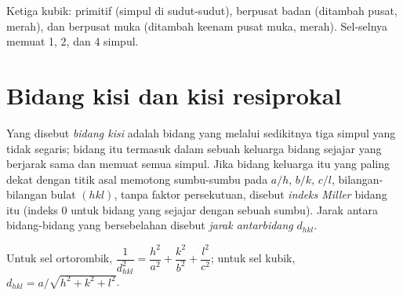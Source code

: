 \begin{omfigure}

{\small Ketiga  kubik: primitif (simpul di sudut-sudut), berpusat
badan (ditambah pusat, merah), dan berpusat muka (ditambah keenam pusat muka,
merah). Sel-selnya memuat 1, 2, dan 4 simpul.}
\end{omfigure}

\section{Bidang kisi dan kisi resiprokal}

\begin{definition}\label{def:b3:x-ray-diffraction:miller}
Yang disebut \emph{bidang kisi} adalah bidang yang melalui
sedikitnya tiga simpul yang tidak segaris; bidang itu termasuk dalam sebuah
keluarga bidang sejajar yang berjarak sama dan memuat semua simpul. Jika
bidang keluarga itu yang paling dekat dengan titik asal memotong sumbu-sumbu
pada $a/h$, $b/k$, $c/l$, bilangan-bilangan bulat $(hkl)$, tanpa faktor
persekutuan, disebut \emph{indeks Miller} bidang itu
(indeks 0 untuk bidang yang sejajar dengan sebuah sumbu). Jarak antara
bidang-bidang yang bersebelahan disebut \emph{jarak
antarbidang} $d_{hkl}$.
\end{definition}

\begin{proposition}\label{prop:b3:x-ray-diffraction:spacing}
Untuk sel ortorombik, $\dfrac{1}{d_{hkl}^2} = \dfrac{h^2}{a^2} + \dfrac{k^2}{b^2} +
\dfrac{l^2}{c^2}$; untuk sel kubik, $d_{hkl} = a/\sqrt{h^2 + k^2 + l^2}$.
\end{proposition}

